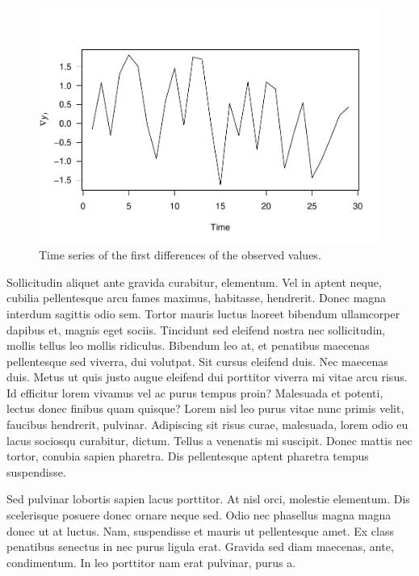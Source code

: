 \documentclass[11pt,]{report}
\begin{document}
\vspace{0.5in}

\begin{figure}
\centering
\includegraphics{hw_06_template_files/figure-latex/rw_diff-1.pdf}
\caption{Time series of the first differences of the observed values.}
\end{figure}

Sollicitudin aliquet ante gravida curabitur, elementum. Vel in aptent
neque, cubilia pellentesque arcu fames maximus, habitasse, hendrerit.
Donec magna interdum sagittis odio sem. Tortor mauris luctus laoreet
bibendum ullamcorper dapibus et, magnis eget sociis. Tincidunt sed
eleifend nostra nec sollicitudin, mollis tellus leo mollis ridiculus.
Bibendum leo at, et penatibus maecenas pellentesque sed viverra, dui
volutpat. Sit cursus eleifend duis. Nec maecenas duis. Metus ut quis
justo augue eleifend dui porttitor viverra mi vitae arcu risus. Id
efficitur lorem vivamus vel ac purus tempus proin? Malesuada et potenti,
lectus donec finibus quam quisque? Lorem nisl leo purus vitae nunc
primis velit, faucibus hendrerit, pulvinar. Adipiscing sit risus curae,
malesuada, lorem odio eu lacus sociosqu curabitur, dictum. Tellus a
venenatis mi suscipit. Donec mattis nec tortor, conubia sapien pharetra.
Dis pellentesque aptent pharetra tempus suspendisse.

Sed pulvinar lobortis sapien lacus porttitor. At nisl orci, molestie
elementum. Dis scelerisque posuere donec ornare neque sed. Odio nec
phasellus magna magna donec ut at luctus. Nam, suspendisse et mauris ut
pellentesque amet. Ex class penatibus senectus in nec purus ligula erat.
Gravida sed diam maecenas, ante, condimentum. In leo porttitor nam erat
pulvinar, purus a.
\end{document}
